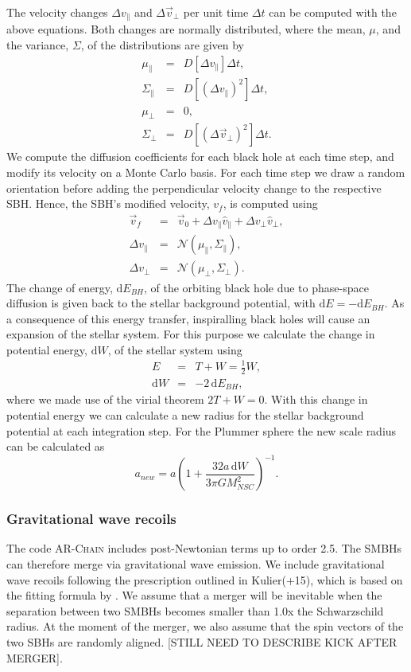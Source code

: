 \documentclass[english, apj]{emulateapj}
\begin{document}
The velocity changes $\Delta v_\parallel$ and $\Delta\vec{v}_\bot$ per unit time $\Delta t$ can be computed with the above equations. Both changes are normally distributed, where the mean, $\mu$, and the variance, $\Sigma$, of the distributions are given by
\begin{eqnarray}
\mu_\parallel &=& D[\Delta v_\parallel]\Delta t,\\
\Sigma_\parallel &=& D[(\Delta v_\parallel)^2]\Delta t,\\
\mu_\bot &=& 0,\\
\Sigma_\bot &=& D[(\Delta \vec{v}_\bot)^2]\Delta t.
\end{eqnarray}
We compute the diffusion coefficients for each black hole at each time step, and modify its velocity on a Monte Carlo basis. For each time step we draw a random orientation before adding the perpendicular velocity change to the respective SBH. Hence, the SBH's modified velocity, $v_f$, is computed using
\begin{eqnarray}
\vec{v}_f &=& \vec{v}_0 + \Delta v_\parallel \hat{v}_\parallel + \Delta v_\bot \hat{v}_\bot,\\
\Delta v_\parallel &=& \mathcal{N}(\mu_\parallel, \Sigma_\parallel),\\
\Delta v_\bot &=& \mathcal{N}(\mu_\bot, \Sigma_\bot).
\end{eqnarray}
The change of energy, $\mbox{d}E_{BH}$, of the orbiting black hole due to phase-space diffusion is given back to the stellar background potential, with $\mbox{d}E = -\mbox{d}E_{BH}$. As a consequence of this energy transfer, inspiralling black holes will cause an expansion of the stellar system. For this purpose we calculate the change in potential energy, $\mbox{d}W$, of the stellar system using
\begin{eqnarray}
E &=& T + W = \frac{1}{2}W,\\
\mbox{d}W &=& -2\,\mbox{d}E_{BH},
\end{eqnarray}
where we made use of the virial theorem $2T+W =0$. With this change in potential energy we can calculate a new radius for the stellar background potential at each integration step. For the Plummer sphere the new scale radius can be calculated as
\begin{equation}
a_{new} = a\left(1+\frac{32a\,\mbox{d}W}{3\pi GM_{NSC}^2}\right)^{-1}.
\end{equation}

\subsubsection{Gravitational wave recoils}
The code \textsc{AR-Chain} includes post-Newtonian terms up to order 2.5. The SMBHs can therefore merge via gravitational wave emission. We include gravitational wave recoils following the prescription outlined in Kulier(+15), which is based on the fitting formula by \citet{2012PhRvD..85h4015L}.  We assume that a merger will be inevitable when the separation between two SMBHs becomes smaller than 1.0x the Schwarzschild radius. At the moment of the merger, we also assume that the spin vectors of the two SBHs are randomly aligned. [STILL NEED TO DESCRIBE KICK AFTER MERGER].
\end{document}
